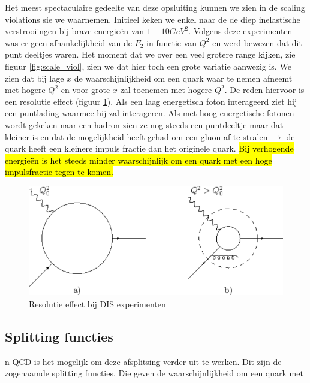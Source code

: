 \documentclass[../main.tex]{subfiles}
\begin{document}
Het meest spectaculaire gedeelte van deze opsluiting kunnen we zien in de scaling violations sie we waarnemen. Initieel keken we enkel naar de de diep inelastische verstrooiingen bij brave energieën van $1-10GeV^2$. Volgens deze experimenten was er geen afhankelijkheid van de $F_2$ in functie van $Q^2$ en werd bewezen dat dit punt deeltjes waren. Het moment dat we over een veel grotere range kijken, zie figuur \ref{fig:scale_viol}, zien we dat hier toch een grote variatie aanwezig is. We zien dat bij lage $x$ de waarschijnlijkheid om een quark waar te nemen afneemt met hogere $Q^2$ en voor grote $x$ zal toenemen met hogere $Q^2$. De reden hiervoor is een resolutie effect (figuur \ref{fig:dis_resolutie}). Als een laag energetisch foton interageerd ziet hij een puntlading waarmee hij zal interageren. Als met hoog energetische fotonen wordt gekeken naar een hadron zien ze nog steeds een puntdeeltje maar dat kleiner is en dat de mogelijkheid heeft gehad om een gluon af te stralen $\rightarrow$ de quark heeft een kleinere impuls fractie dan het originele quark. \hl{Bij verhogende energieën is het steeds minder waarschijnlijk om een quark met een hoge impulsfractie tegen te komen.}

\begin{figure}[h]
    \centering
    \includegraphics[width=0.8\linewidth]{QCD/resolutie.png}
    \caption{Resolutie effect bij DIS experimenten}%
    \label{fig:dis_resolutie}
\end{figure}

\subsection{Splitting functies}%
\label{sub:splitting_functies}

n QCD is het mogelijk om deze afsplitsing verder uit te werken. Dit zijn de zogenaamde splitting functies. Die geven de waarschijnlijkheid om een quark met
\end{document}
